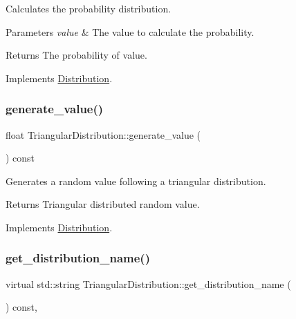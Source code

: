 Calculates the probability distribution. 
\begin{DoxyParams}{Parameters}
{\em value} & The value to calculate the probability. \\
\hline
\end{DoxyParams}
\begin{DoxyReturn}{Returns}
The probability of value. 
\end{DoxyReturn}


Implements \hyperlink{classDistribution_a0778c93fb686dd1abe2830e1c7e564a6}{Distribution}.

\mbox{\label{classTriangularDistribution_a76d6a4477676d8f4d85513b887b4f2b3}} 
\subsubsection{\texorpdfstring{generate\+\_\+value()}{generate\_value()}}
{\footnotesize\ttfamily float Triangular\+Distribution\+::generate\+\_\+value (\begin{DoxyParamCaption}{ }\end{DoxyParamCaption}) const\hspace{0.3cm}{\ttfamily [virtual]}}

Generates a random value following a triangular distribution. \begin{DoxyReturn}{Returns}
Triangular distributed random value. 
\end{DoxyReturn}


Implements \hyperlink{classDistribution_aa1ea89994ac123f003b8b8f5fe6fad40}{Distribution}.

\mbox{\label{classTriangularDistribution_ae9ceb04d07ea5f9dd9390ec62a7d0849}} 
\subsubsection{\texorpdfstring{get\+\_\+distribution\+\_\+name()}{get\_distribution\_name()}}
{\footnotesize\ttfamily virtual std\+::string Triangular\+Distribution\+::get\+\_\+distribution\+\_\+name (\begin{DoxyParamCaption}{ }\end{DoxyParamCaption}) const\hspace{0.3cm}{\ttfamily [inline]}, {\ttfamily [virtual]}}

